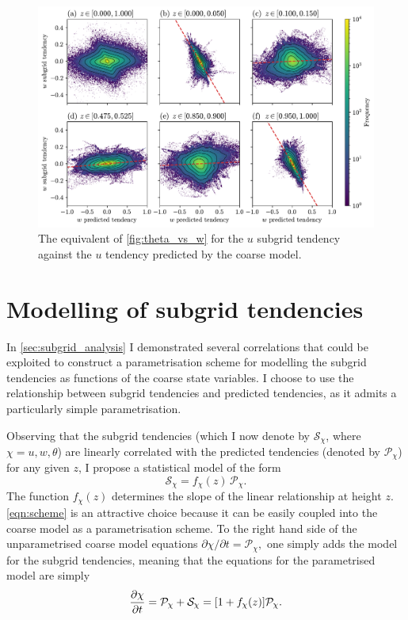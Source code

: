 \documentclass[../main.tex]{subfiles}
\begin{document}
\begin{figure}[ht]
    \centering
    \includegraphics[width=0.95\linewidth]{figures/w_subgrid_vs_pred_tend.pdf}
    \caption{
        The equivalent of \cref{fig:theta_vs_w} for the $u$ subgrid
        tendency against the $u$ tendency predicted by the coarse model.
    }
    \label{fig:w_subgrid_vs_pred_tend}
\end{figure}


\section{Modelling of subgrid tendencies}
In \cref{sec:subgrid_analysis} I demonstrated several correlations that could
be exploited to construct a parametrisation scheme for modelling the subgrid
tendencies as functions of the coarse state variables. I choose to use the
relationship between subgrid tendencies and predicted tendencies, as it admits
a particularly simple parametrisation.

Observing that the subgrid tendencies (which I now denote by
$\mathcal{S}_\chi$, where $\chi = u, w, \theta$) are linearly correlated with
the predicted tendencies (denoted by $\mathcal{P}_\chi$) for any given $z$, I
propose a statistical model of the form
\begin{equation} \label{eqn:scheme}
    \mathcal{S}_\chi =  f_\chi(z)\,\mathcal{P}_\chi.
\end{equation}
The function $f_\chi(z)$ determines the slope of the linear relationship at
height $z$. \cref{eqn:scheme} is an attractive choice because it can be easily
coupled into the coarse model as a parametrisation scheme. To the right hand
side of the unparametrised coarse model equations $\partial \chi/\partial t =
\mathcal{P}_\chi,$ one simply adds the model for the subgrid tendencies,
meaning that the equations for the parametrised model are simply
\begin{equation} \label{eqn:res_tend_parametrised_model}
    \frac{\partial \chi}{\partial t} = \mathcal{P}_\chi + \mathcal{S}_\chi
        = [1 + f_\chi(z)] \mathcal{P}_\chi.
\end{equation}
\end{document}

